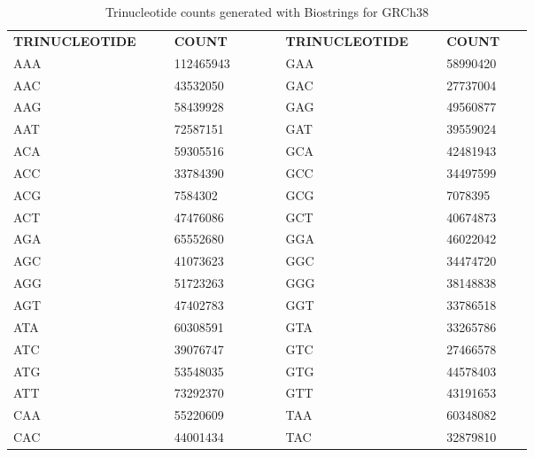 \begin{table}[ht]
\caption[Trinucleotide counts of GRCh38]{Trinucleotide counts generated with Biostrings \cite{Pages2020} for GRCh38}\label{A:mmf:tab:tricounts}
\centering
{}
\begin{tabular}{|C{0.26\linewidth} | R{0.14\linewidth}| C{0.04\linewidth} |C{0.26\linewidth} | R{0.14\linewidth}|}
\toprule
 \hhline{|-|-|~|-|-|}
 \textbf{TRINUCLEOTIDE} & \textbf{COUNT} &  & \textbf{TRINUCLEOTIDE} & \textbf{COUNT}\\
 \hhline{|-|-|~|-|-|}

AAA & \num{ 112465943} &  & GAA & \num{ 58990420} \\
AAC & \num{ 43532050} &  & GAC & \num{ 27737004} \\
AAG & \num{ 58439928} &  & GAG & \num{ 49560877} \\
AAT & \num{ 72587151} &  & GAT & \num{ 39559024} \\
ACA & \num{ 59305516} &  & GCA & \num{ 42481943} \\
ACC & \num{ 33784390} &  & GCC & \num{ 34497599} \\
ACG & \num{ 7584302} &  & GCG & \num{ 7078395} \\
ACT & \num{ 47476086} &  & GCT & \num{ 40674873} \\
AGA & \num{ 65552680} &  & GGA & \num{ 46022042} \\
AGC & \num{ 41073623} &  &GGC & \num{ 34474720} \\
AGG & \num{ 51723263} &  &GGG & \num{ 38148838} \\
AGT & \num{ 47402783} &  &GGT & \num{ 33786518} \\
ATA & \num{ 60308591} &  &GTA & \num{ 33265786} \\
ATC & \num{ 39076747} &  &GTC & \num{ 27466578} \\
ATG & \num{ 53548035} &  &GTG & \num{ 44578403} \\
ATT & \num{ 73292370} &  &GTT & \num{ 43191653} \\
CAA & \num{ 55220609} &  &TAA & \num{ 60348082} \\
CAC & \num{ 44001434} &  &TAC & \num{ 32879810} \\

\end{tabular}
\end{table}
